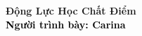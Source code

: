 \begin{frame}[noframenumbering]
    \thispagestyle{empty}
    \bfseries
    \begin{flushleft}
        \vfill
        \vspace{5mm}
        \textcolor{BlueDefault}{\huge \bfseries Động Lực Học Chất Điểm} \\
        \vspace{8mm}
        \textcolor{black}{\large \bfseries Người trình bày: Carina }
        \vfill
    \end{flushleft}
\end{frame}